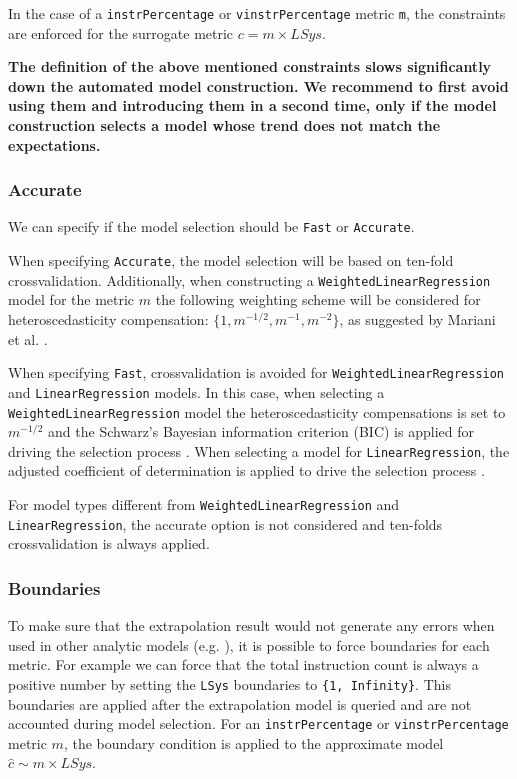 \documentclass[a4paper, 10pt]{article}
\begin{document}
In the case of a \verb!instrPercentage! or \verb!vinstrPercentage! metric \verb!m!, the constraints are enforced for the surrogate metric
$c= m \times LSys$.

\textbf{The definition of the above mentioned constraints slows significantly down the automated model construction.
We recommend to first avoid using them and introducing them in a second time,
only if the model construction selects a model whose trend does not match the expectations.}


\subsubsection{Accurate}
\label{sec:accurate}

We can specify if the model selection should be \verb!Fast! or \verb!Accurate!.

When specifying \verb!Accurate!, the model selection will be based on ten-fold crossvalidation. Additionally,
when constructing a \verb!WeightedLinearRegression! model for the metric $m$
the following weighting scheme will be considered for heteroscedasticity compensation: $\{ 1, m^{-1/2}, m^{-1}, m^{-2}\}$,
as suggested by Mariani et al. \cite{mariani2016ijpp}.

When specifying \verb!Fast!, crossvalidation is avoided for \verb!WeightedLinearRegression! and \verb!LinearRegression! models.
In this case, when selecting a \verb!WeightedLinearRegression! model the heteroscedasticity compensations is set to $m^{-1/2}$
and the Schwarz's Bayesian information criterion (BIC) is applied for driving the selection process
\cite{mariani2015cf}. When selecting a model for \verb!LinearRegression!, the adjusted coefficient of determination is
applied to drive the selection process \cite{calotoiu2013}.

For model types different from \verb!WeightedLinearRegression! and \verb!LinearRegression!, the accurate option is not
considered and ten-folds crossvalidation is always applied.

\subsubsection{Boundaries}
\label{sec:boundaries}

To make sure that the extrapolation result would not generate any errors when used in other analytic models (e.g. \eb),
it is possible to force boundaries for each metric. For example we can force that the total instruction count is always a positive number
by setting the \verb!LSys! boundaries to \verb!{1, Infinity}!. This boundaries are applied after the extrapolation model is queried
and are not accounted during model selection. For an \verb!instrPercentage! or \verb!vinstrPercentage! metric $m$,
the boundary condition is applied to the approximate model $\hat{c}\sim m \times LSys$.
\end{document}
